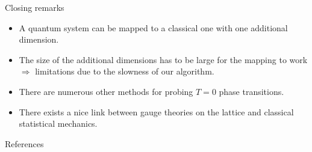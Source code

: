 \documentclass[aspectratio=169, xcolor=dvipsnames]{beamer}
\begin{document}
\begin{frame}{Closing remarks}
	
	\begin{itemize}
		\itemsep 1cm
		
		\item A quantum system can be mapped to a classical one with one additional dimension.
		
		\item The size of the additional dimensions has to be large for the mapping to work $\Rightarrow$ limitations due to the slowness of our algorithm.
		
		\item There are numerous other methods for probing $T=0$ phase transitions.
		
		\item There exists a nice link between gauge theories on the lattice and classical statistical mechanics.
	\end{itemize}
	
	
	
\end{frame}


\begin{frame}{References}
	\printbibliography
\end{frame}
\end{document}

